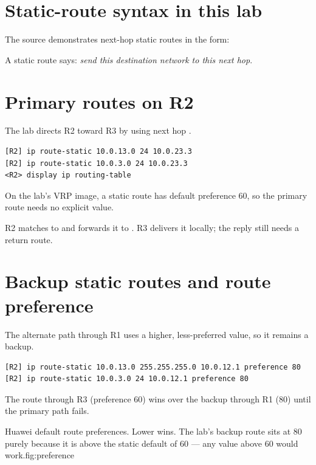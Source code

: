 \section{Static-route syntax in this lab}
The source demonstrates next-hop static routes in the form:
\begin{center}
\end{center}
A static route says: \emph{send this destination network to this next hop}.

\section{Primary routes on R2}
The lab directs R2 toward R3 by using next hop .
\begin{lstlisting}[style=utpterminal]
[R2] ip route-static 10.0.13.0 24 10.0.23.3
[R2] ip route-static 10.0.3.0 24 10.0.23.3
<R2> display ip routing-table
\end{lstlisting}
On the lab's VRP image, a static route has default preference 60, so the primary route needs no explicit value.

\begin{workedexample}
R2 matches  to  and forwards it to . R3 delivers it locally; the reply still needs a return route.
\end{workedexample}

\section{Backup static routes and route preference}
The alternate path through R1 uses a higher, less-preferred value, so it remains a backup.
\begin{lstlisting}[style=utpterminal]
[R2] ip route-static 10.0.13.0 255.255.255.0 10.0.12.1 preference 80
[R2] ip route-static 10.0.3.0 24 10.0.12.1 preference 80
\end{lstlisting}
The route through R3 (preference 60) wins over the backup through R1 (80) until the primary path fails.

\begin{utpfig}{Huawei default route preferences. Lower wins. The
lab's backup route sits at 80 purely because it is above the static default of 60
--- any value above 60 would work.}{fig:preference}
\end{utpfig}

